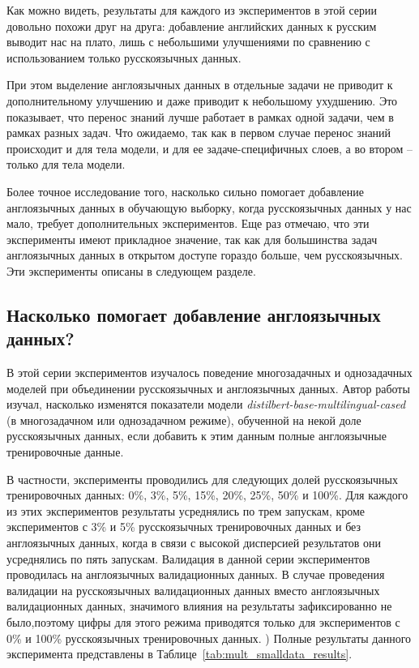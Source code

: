 Как можно видеть, результаты для каждого из экспериментов в этой серии довольно похожи друг на друга: добавление английских данных к русским выводит нас на плато, лишь с небольшими улучшениями по сравнению с использованием только русскоязычных данных.  

При этом выделение англоязычных данных в отдельные задачи не приводит к дополнительному улучшению и даже приводит к небольшому ухудшению. Это показывает, что перенос знаний лучше работает в рамках одной задачи, чем в рамках разных задач. Что ожидаемо, так как в первом случае перенос знаний происходит и для тела модели, и для ее задаче-специфичных слоев, а во втором -- только для тела модели. 

Более точное исследование того, насколько сильно помогает добавление англоязычных данных в обучающую выборку, когда русскоязычных данных у нас мало, требует дополнительных экспериментов. Еще раз отмечаю, что эти эксперименты имеют прикладное значение, так как для большинства задач англоязычных данных в открытом доступе гораздо больше, чем русскоязычных. Эти эксперименты описаны в следующем разделе.

\subsection{Насколько помогает добавление англоязычных данных? }

В этой серии экспериментов изучалось поведение многозадачных и однозадачных моделей при объединении русскоязычных и англоязычных данных.  Автор работы изучал, насколько изменятся показатели модели \textit{distilbert-base-multilingual-cased} (в многозадачном или однозадачном режиме), обученной на некой доле русскоязычных данных, если добавить к этим данным полные англоязычные тренировочные данные.

В частности, эксперименты проводились для следующих долей русскоязычных тренировочных данных: 0\%, 3\%, 5\%, 15\%, 20\%, 25\%, 50\% и 100\%. Для каждого из этих экспериментов результаты усреднялись по трем запускам, кроме экспериментов с 3\% и 5\% русскоязычных тренировочных данных и без англоязычных данных, когда в связи с высокой дисперсией результатов они усреднялись по пять запускам. 
Валидация в данной серии экспериментов проводилась на англоязычных валидационных данных. В случае проведения валидации на русскоязычных валидационных данных вместо англоязычных валидационных данных, значимого влияния на результаты зафиксированно не было,поэтому цифры для этого режима приводятся только для экспериментов с 0\% и 100\% русскоязычных тренировочных данных. ) 
 Полные результаты данного эксперимента представлены в Таблице~\ref{tab:mult_smalldata_results}. 

